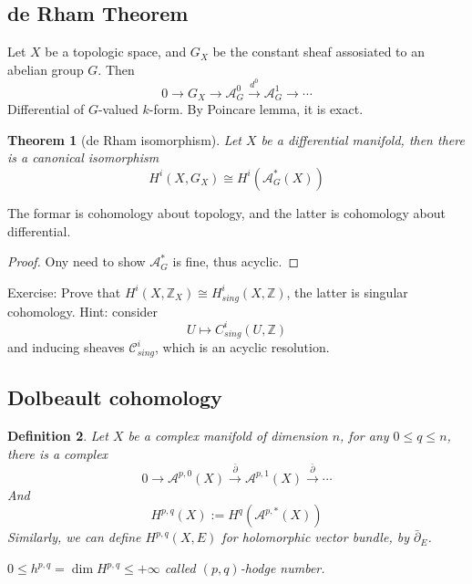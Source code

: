 \documentclass{article}
\newtheorem{definition}{Definition}[subsection]
\newtheorem{theorem}[definition]{Theorem}
\begin{document}
\subsection{de Rham Theorem}
Let $X$ be a topologic space, and $G_{X}$ be the constant sheaf assosiated to an abelian group $G$.  
Then
\[
  0 \to G_{X} \to \mathcal{A}_{G}^{0}\xrightarrow{d^{0}}\mathcal{A}_{G}^{1}\to \cdots
\]
Differential of $G$-valued $k$-form.  By Poincare lemma, it is exact.
\begin{theorem}[de Rham isomorphism]
  Let $X$ be a differential manifold, then there is a canonical isomorphism
  \[
    H^{i}(X,G_{X}) \cong H^{i}(\mathcal{A}_{G}^{*}(X))
  \]
\end{theorem}
The formar is cohomology about topology, and the latter is cohomology about differential.
\begin{proof}
  Ony need to show $\mathcal{A}_{G}^*$ is fine, thus acyclic. 
\end{proof}
Exercise: Prove that $H^{i}(X,\mathbb{Z}_{X})\cong H_{sing}^{i}(X,\mathbb{Z})$, the latter is singular cohomology. 
Hint: consider
\[
  U \mapsto C^{i}_{sing}(U,\mathbb{Z})
\]
and inducing sheaves $\mathcal{C}^{i}_{sing}$, which is an acyclic resolution.
\subsection{Dolbeault cohomology}
\begin{definition}
  Let $X$ be a complex manifold of dimension $n$, for any $0\leqslant q \leqslant n$, there is a complex
  \[
    0\to \mathcal{A}^{p,0}(X)\xrightarrow{ \bar{\partial}} \mathcal{A}^{p,1}(X)\xrightarrow{ \bar{\partial}} \cdots
  \]
 And
 \[
  H^{p,q}(X) := H^{q}(\mathcal{A}^{p,*}(X))
 \]
Similarly, we can define $H^{p,q}(X,E)$ for holomorphic vector bundle, by $ \bar{\partial}_{E}$.

$0\leqslant h^{p,q}=\dim H^{p,q}\leqslant + \infty$ called $(p,q)$-hodge number.
\end{definition}
\end{document}
